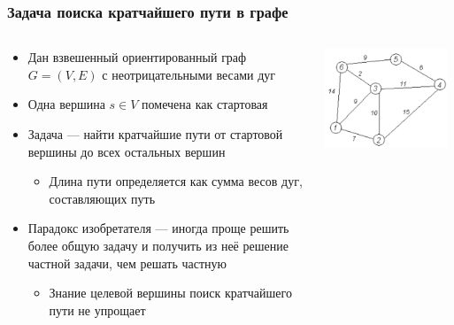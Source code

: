 \documentclass[xetex,mathserif,serif]{beamer}
\begin{document}
\begin{frame}
\begin{columns}
\begin{column}{0.3\textwidth}
\begin{center}
                \end{center}
            \end{column}
        \end{columns}
    \end{frame}

    \begin{frame}
        \frametitle{Задача поиска кратчайшего пути в графе}
        \begin{columns}
            \begin{column}{0.65\textwidth}
                \begin{itemize}
                    \item Дан взвешенный ориентированный граф $G = (V, E)$ с неотрицательными весами дуг
                    \item Одна вершина $s \in V$ помечена как стартовая
                    \item Задача --- найти кратчайшие пути от стартовой вершины до всех остальных вершин
                    \begin{itemize}
                        \item Длина пути определяется как сумма весов дуг, составляющих путь
                    \end{itemize}
                    \item Парадокс изобретателя --- иногда проще решить более общую задачу и получить из неё решение частной задачи, чем решать частную
                    \begin{itemize}
                        \item Знание целевой вершины поиск кратчайшего пути не упрощает
                    \end{itemize}
                \end{itemize}
            \end{column}
            \begin{column}{0.35\textwidth}
                \begin{center}
                    \includegraphics[width=0.95\textwidth]{shortest-path.png}

\end{center}
\end{column}
\end{columns}
\end{frame}
\end{document}
